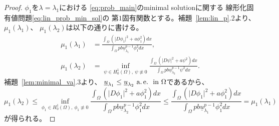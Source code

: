 \begin{proof}
 $\phi_1$を$\lambda = \lambda_1$における
 \ref{eq:prob_main}のminimal solutionに関する
 線形化固有値問題\eqref{eq:lin_prob_min_sol}の
 第$1$固有関数とする。補題~\ref{lem:lin_p}.2より、$\mu_1(\lambda_1)$、
 $\mu_1(\lambda_2)$は以下の通りに書ける。
 \begin{align*}
  \mu_1(\lambda_1) &= \frac{\displaystyle 
  \int_\Omega \left( \lvert D\phi_1 \rvert^2
  + a \phi_1^2 \right) dx}{\displaystyle \int_\Omega p b
  \underline{u}_{\lambda_1}^{p-1} \phi_1^2 dx}, \\
  \mu_1(\lambda_2) &= \inf_{\psi \in H_0^1(\Omega), \ \psi \not\equiv
  0} \frac{\displaystyle 
  \int_\Omega \left( \lvert D\psi \rvert^2
  + a \psi^2 \right) dx}{\displaystyle \int_\Omega p b
  \underline{u}_{\lambda_2}^{p-1} \psi^2 dx}.
 \end{align*}
 補題~\ref{lem:minimal_va}.3より、
 $\underline{u}_{\lambda_1} \leq \underline{u}_{\lambda_2} ~\text{a.\,e.}~ ~\text{in}~
 \Omega$であるから、
 \[
  \mu_1(\lambda_2) \leq 
  \inf_{\phi_1 \in H_0^1(\Omega), \ \phi_1 \not\equiv
  0} \frac{\displaystyle 
  \int_\Omega \left( \lvert D\phi_1 \rvert^2
  + a \phi_1^2 \right) dx}{\displaystyle \int_\Omega p b
  \underline{u}_{\lambda_2}^{p-1} \phi_1^2 dx} \leq
  \frac{\displaystyle 
  \int_\Omega \left( \lvert D\phi_1 \rvert^2
  + a \phi_1^2 \right) dx}{\displaystyle \int_\Omega p b
  \underline{u}_{\lambda_1}^{p-1} \phi_1^2 dx} = \mu_1(\lambda_1)
 \]
 が得られる。 \qedhere
\end{proof}

